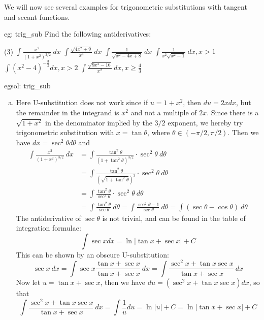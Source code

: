     We will now see several examples for trigonometric substitutions with tangent and secant functions.

    \begin{eg}[]{eg: trig_sub}
        Find the following antiderivatives:
        \begin{tasks}(3)
            \task $\int \frac{x^2}{(1+x^2)^{3/2}}~dx$
            \task $\int \frac{\sqrt{4x^2 + 9}}{x^4}~dx$
            \task $\int \frac{1}{\sqrt{x^2-4x+8}}~dx$
            \task $\int \frac{1}{x^2\sqrt{x^2-1}}~dx, x > 1$
            \task $\int (x^2-4)^{-\frac{3}{2}}dx, x > 2$
            \task $\int \frac{\sqrt{9x^2-16}}{x^2}~dx, x \ge \frac{4}{3}$
        \end{tasks}
    \end{eg}
    \begin{egsol}[]{egsol: trig_sub}
        \begin{enumerate}[a)]
            \item Here U-substitution does not work since if $u = 1+x^2$, then $du = 2xdx$, but the remainder in the integrand is $x^2$ and not a multiple of $2x$.  Since there is a $\sqrt{1+x^2}$ in the denominator implied by the $3/2$ exponent, we hereby try trigonometric substitution with $x = \tan \theta$, where $\theta \in (-\pi/2, \pi/2)$.  Then we have $dx = \sec^2\theta d\theta$ and 
            \begin{align*}
                \int \frac{x^2}{(1+x^2)^{3/2}}~dx &= \int \frac{\tan^2 \theta}{(1+\tan^2\theta)^{3/2}}\cdot\sec^2\theta~d\theta\\
                &= \int \frac{\tan^2 \theta}{(\sqrt{1+\tan^2\theta})^3} \cdot \sec^2\theta~d\theta\\
                &= \int \frac{\tan^2 \theta}{\sec^3\theta} \cdot \sec^2\theta~d\theta\\
                &= \int \frac{\tan^2\theta}{\sec \theta}~d\theta = \int \frac{\sec^2\theta - 1}{\sec \theta}~d\theta = \int (\sec \theta - \cos\theta)~d\theta
            \end{align*}
            The antiderivative of $\sec \theta$ is not trivial, and can be found in the table of integration formulae:
            \[\int \sec x dx = \ln|\tan x + \sec x| + C\]
            This can be shown by an obscure U-substitution:
            \[\sec x~dx = \int \sec x \frac{\tan x + \sec x}{\tan x + \sec x}~ dx = \int \frac{\sec^2x + \tan x \sec x}{\tan x + \sec x}~dx\]
            Now let $u = \tan x + \sec x$, then we have $du = (\sec^2 x + \tan x\sec x)dx$, so that
            \[\int \frac{\sec^2x + \tan x \sec x}{\tan x + \sec x}~dx = \int \frac{1}{u} du = \ln|u| + C = \ln|\tan x + \sec x| + C\]

\end{enumerate}
\end{egsol}
